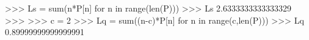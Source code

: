 
>>> Ls = sum(n*P[n] for n in range(len(P)))
>>> Ls
2.6333333333333329
>>>
>>> c = 2
>>> Lq = sum((n-c)*P[n] for n in range(c,len(P)))
>>> Lq
0.89999999999999991

